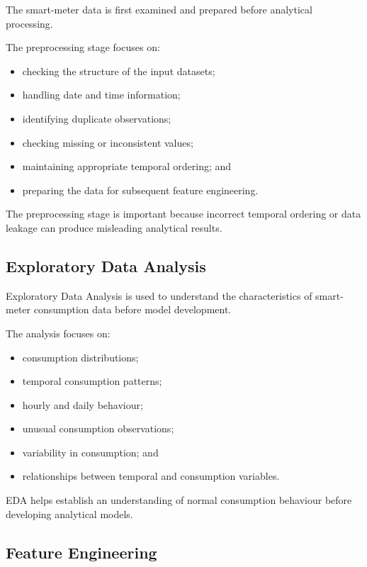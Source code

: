 \documentclass{tietreport}
\begin{document}
The smart-meter data is first examined and prepared before analytical
processing.

The preprocessing stage focuses on:

\begin{itemize}
    \item checking the structure of the input datasets;
    \item handling date and time information;
    \item identifying duplicate observations;
    \item checking missing or inconsistent values;
    \item maintaining appropriate temporal ordering; and
    \item preparing the data for subsequent feature engineering.
\end{itemize}

The preprocessing stage is important because incorrect temporal ordering or
data leakage can produce misleading analytical results.

\subsection{Exploratory Data Analysis}

Exploratory Data Analysis is used to understand the characteristics of
smart-meter consumption data before model development.

The analysis focuses on:

\begin{itemize}
    \item consumption distributions;
    \item temporal consumption patterns;
    \item hourly and daily behaviour;
    \item unusual consumption observations;
    \item variability in consumption; and
    \item relationships between temporal and consumption variables.
\end{itemize}

EDA helps establish an understanding of normal consumption behaviour before
developing analytical models.

\subsection{Feature Engineering}
\end{document}
